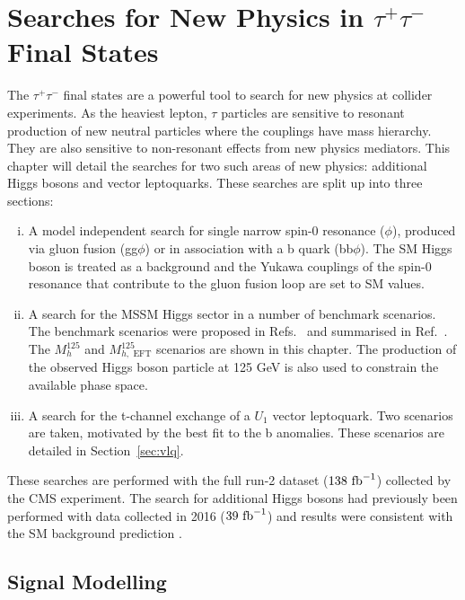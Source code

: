 \chapter{\texorpdfstring{Searches for New Physics in $\tau^+\tau^-$ Final States}{Search for new physics in tautau final states}}
\label{sec:bsm_H_to_tau_tau_analysis}
 
The $\tau^+\tau^-$ final states are a powerful tool to search for new physics at collider experiments. 
As the heaviest lepton, $\tau$ particles are sensitive to resonant production of new neutral particles where the couplings have mass hierarchy.
They are also sensitive to non-resonant effects from new physics mediators. 
This chapter will detail the searches for two such areas of new physics: additional Higgs bosons and vector leptoquarks.
These searches are split up into three sections: 
\begin{enumerate}[i)]
  \item A model independent search for single narrow spin-0 resonance ($\phi$), produced via gluon fusion (gg$\phi$) or in association with a b quark (bb$\phi$). The SM Higgs boson is treated as a background and the Yukawa couplings of the spin-0 resonance that contribute to the gluon fusion loop are set to SM values.
   \item A search for the MSSM Higgs sector in a number of benchmark scenarios. The benchmark scenarios were proposed in Refs.~\cite{Bahl:2018zmf,Bahl:2020kwe,Bahl:2019ago} and summarised in Ref.~\cite{Bagnaschi:2791954}. The $M_{h}^{125}$ and $M_{h,\text{ EFT}}^{125}$ scenarios are shown in this chapter. The production of the observed Higgs boson particle at 125 GeV is also used to constrain the available phase space.
  \item A search for the t-channel exchange of a $U_{1}$ vector leptoquark. Two scenarios are taken, motivated by the best fit to the b anomalies. These scenarios are detailed in Section~\ref{sec:vlq}.
\end{enumerate}

These searches are performed with the full run-2 dataset ($138 \text{ fb}^{-1}$) collected by the CMS experiment. 
The search for additional Higgs bosons had previously been performed with data collected in 2016 ($39 \text{ fb}^{-1}$) and results were consistent with the SM background prediction \cite{CMS_MSSM_Tau_2018}.
 
\section{Signal Modelling} 
 
